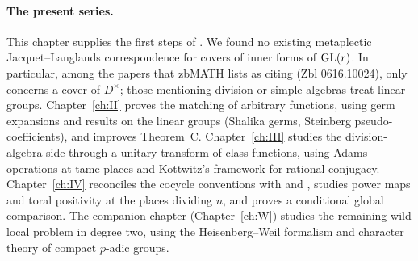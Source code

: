 \paragraph{The present series.} This chapter supplies the first steps of \cite[Remark~10.3]{JC26a}. We found no existing metaplectic Jacquet--Langlands correspondence for covers of inner forms of $\GL(r)$. In particular, among the papers that zbMATH lists as citing \cite{FK86} (Zbl 0616.10024), only \cite{Jo88} concerns a cover of $D^\times$; those mentioning division or simple algebras treat linear groups. Chapter~\ref{ch:II} proves the matching of arbitrary functions, using germ expansions \cite[\S8]{FK86} and results on the linear groups (Shalika germs, Steinberg pseudo-coefficients), and improves Theorem~C. Chapter~\ref{ch:III} studies the division-algebra side through a unitary transform of class functions, using Adams operations at tame places and Kottwitz's framework for rational conjugacy. Chapter~\ref{ch:IV} reconciles the cocycle conventions with \cite{FK86} and \cite{Zo23}, studies power maps and toral positivity at the places dividing $n$, and proves a conditional global comparison. The companion chapter (Chapter~\ref{ch:W}) studies the remaining wild local problem in degree two, using the Heisenberg--Weil formalism and character theory of compact $p$-adic groups.
\endgroup
\begingroup
\providecommand{\ov}{}\renewcommand{\ov}[1]{\overline{#1}}
\providecommand{\A}{}\renewcommand{\A}{\mathbb{A}}
\providecommand{\C}{}\renewcommand{\C}{\mathbb{C}}
\providecommand{\Z}{}\renewcommand{\Z}{\mathbb{Z}}
\providecommand{\cO}{}\renewcommand{\cO}{\mathcal{O}}
\providecommand{\fp}{}\renewcommand{\fp}{\mathfrak{p}}
\providecommand{\gen}{}\renewcommand{\gen}{\mathrm{gen}}
\providecommand{\reg}{}\renewcommand{\reg}{\mathrm{reg}}
\providecommand{\tr}{}\renewcommand{\tr}{\operatorname{tr}}
\providecommand{\Nrd}{}\renewcommand{\Nrd}{\operatorname{Nrd}}
\providecommand{\Ad}{}\renewcommand{\Ad}{\operatorname{Ad}}
\providecommand{\Iso}{}\renewcommand{\Iso}{\operatorname{Iso}}
\providecommand{\vol}{}\renewcommand{\vol}{\operatorname{vol}}
\providecommand{\supp}{}\renewcommand{\supp}{\operatorname{supp}}
\providecommand{\Cent}{}\renewcommand{\Cent}{\operatorname{Cent}}
\providecommand{\GL}{}\renewcommand{\GL}{\mathrm{GL}}
\providecommand{\St}{}\renewcommand{\St}{\mathrm{St}}
\providecommand{\Gb}{}\renewcommand{\Gb}{\ov{G}}
\providecommand{\Zb}{}\renewcommand{\Zb}{\ov{Z}}
\providecommand{\GDb}{}\renewcommand{\GDb}{\ov{G}_D}
\providecommand{\pib}{}\renewcommand{\pib}{\ov{\pi}}
\providecommand{\Eb}{}\renewcommand{\Eb}{\ov{E}}
\providecommand{\Tb}{}\renewcommand{\Tb}{\ov{T}}
\providecommand{\cG}{}\renewcommand{\cG}{\mathcal{G}}
\providecommand{\cGb}{}\renewcommand{\cGb}{\ov{\mathcal{G}}}
\providecommand{\iD}{}\renewcommand{\iD}{\iota_D}
\providecommand{\iG}{}\renewcommand{\iG}{\iota_{\GL}}
\providecommand{\jj}{}\renewcommand{\jj}{\jmath}
\providecommand{\sg}{}\renewcommand{\sg}{\sigma}
\providecommand{\Pv}{}\renewcommand{\Pv}{\textbf{(P)}}
\providecommand{\Ev}{}\renewcommand{\Ev}{\textbf{(E)}}
\providecommand{\Ov}{}\renewcommand{\Ov}{\textbf{(O)}}
\providecommand{\Cv}{}\renewcommand{\Cv}{\textbf{(C)}}
